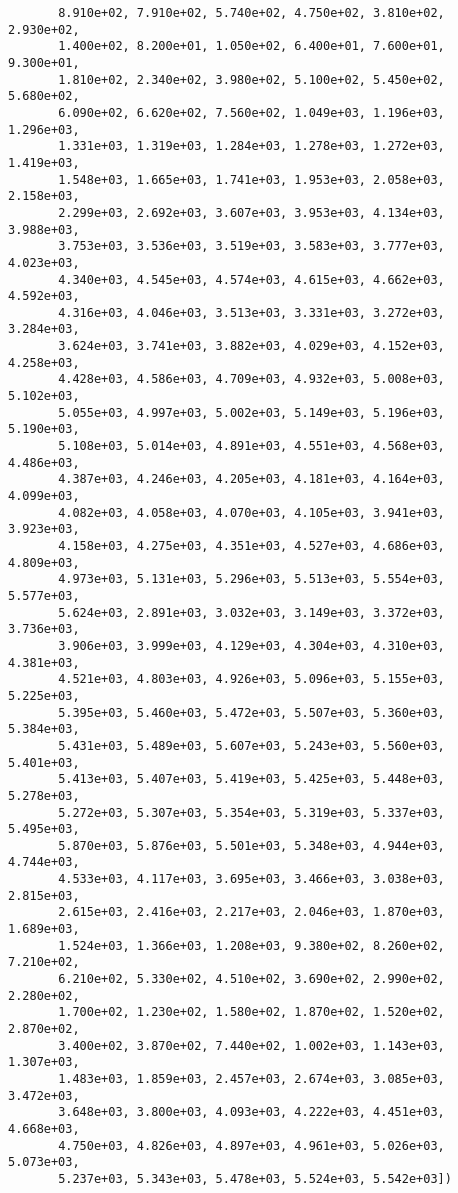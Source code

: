 \documentclass[11pt]{article}
\begin{document}
\begin{verbatim}
       8.910e+02, 7.910e+02, 5.740e+02, 4.750e+02, 3.810e+02, 2.930e+02,
       1.400e+02, 8.200e+01, 1.050e+02, 6.400e+01, 7.600e+01, 9.300e+01,
       1.810e+02, 2.340e+02, 3.980e+02, 5.100e+02, 5.450e+02, 5.680e+02,
       6.090e+02, 6.620e+02, 7.560e+02, 1.049e+03, 1.196e+03, 1.296e+03,
       1.331e+03, 1.319e+03, 1.284e+03, 1.278e+03, 1.272e+03, 1.419e+03,
       1.548e+03, 1.665e+03, 1.741e+03, 1.953e+03, 2.058e+03, 2.158e+03,
       2.299e+03, 2.692e+03, 3.607e+03, 3.953e+03, 4.134e+03, 3.988e+03,
       3.753e+03, 3.536e+03, 3.519e+03, 3.583e+03, 3.777e+03, 4.023e+03,
       4.340e+03, 4.545e+03, 4.574e+03, 4.615e+03, 4.662e+03, 4.592e+03,
       4.316e+03, 4.046e+03, 3.513e+03, 3.331e+03, 3.272e+03, 3.284e+03,
       3.624e+03, 3.741e+03, 3.882e+03, 4.029e+03, 4.152e+03, 4.258e+03,
       4.428e+03, 4.586e+03, 4.709e+03, 4.932e+03, 5.008e+03, 5.102e+03,
       5.055e+03, 4.997e+03, 5.002e+03, 5.149e+03, 5.196e+03, 5.190e+03,
       5.108e+03, 5.014e+03, 4.891e+03, 4.551e+03, 4.568e+03, 4.486e+03,
       4.387e+03, 4.246e+03, 4.205e+03, 4.181e+03, 4.164e+03, 4.099e+03,
       4.082e+03, 4.058e+03, 4.070e+03, 4.105e+03, 3.941e+03, 3.923e+03,
       4.158e+03, 4.275e+03, 4.351e+03, 4.527e+03, 4.686e+03, 4.809e+03,
       4.973e+03, 5.131e+03, 5.296e+03, 5.513e+03, 5.554e+03, 5.577e+03,
       5.624e+03, 2.891e+03, 3.032e+03, 3.149e+03, 3.372e+03, 3.736e+03,
       3.906e+03, 3.999e+03, 4.129e+03, 4.304e+03, 4.310e+03, 4.381e+03,
       4.521e+03, 4.803e+03, 4.926e+03, 5.096e+03, 5.155e+03, 5.225e+03,
       5.395e+03, 5.460e+03, 5.472e+03, 5.507e+03, 5.360e+03, 5.384e+03,
       5.431e+03, 5.489e+03, 5.607e+03, 5.243e+03, 5.560e+03, 5.401e+03,
       5.413e+03, 5.407e+03, 5.419e+03, 5.425e+03, 5.448e+03, 5.278e+03,
       5.272e+03, 5.307e+03, 5.354e+03, 5.319e+03, 5.337e+03, 5.495e+03,
       5.870e+03, 5.876e+03, 5.501e+03, 5.348e+03, 4.944e+03, 4.744e+03,
       4.533e+03, 4.117e+03, 3.695e+03, 3.466e+03, 3.038e+03, 2.815e+03,
       2.615e+03, 2.416e+03, 2.217e+03, 2.046e+03, 1.870e+03, 1.689e+03,
       1.524e+03, 1.366e+03, 1.208e+03, 9.380e+02, 8.260e+02, 7.210e+02,
       6.210e+02, 5.330e+02, 4.510e+02, 3.690e+02, 2.990e+02, 2.280e+02,
       1.700e+02, 1.230e+02, 1.580e+02, 1.870e+02, 1.520e+02, 2.870e+02,
       3.400e+02, 3.870e+02, 7.440e+02, 1.002e+03, 1.143e+03, 1.307e+03,
       1.483e+03, 1.859e+03, 2.457e+03, 2.674e+03, 3.085e+03, 3.472e+03,
       3.648e+03, 3.800e+03, 4.093e+03, 4.222e+03, 4.451e+03, 4.668e+03,
       4.750e+03, 4.826e+03, 4.897e+03, 4.961e+03, 5.026e+03, 5.073e+03,
       5.237e+03, 5.343e+03, 5.478e+03, 5.524e+03, 5.542e+03])
    \end{verbatim}
\end{document}
